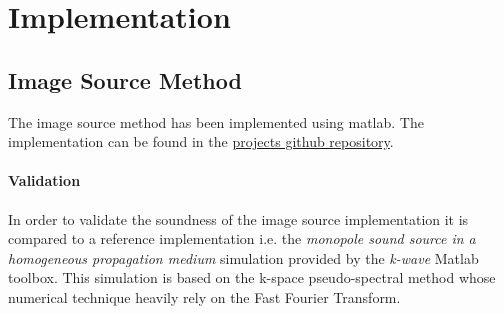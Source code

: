 \chapter{Implementation}
\label{chap:implementation}
\section{Image Source Method}
The image source method has been implemented using matlab. The implementation can be found in the \color{blue}\href{https://github.com/leonardberresheim/MA---Active-Noise-Control-in-Spatial-Domains/tree/main/Matlab/Image_Source_Method/ISM}{projects github repository}.\color{black}


\subsubsection{Validation}
In order to validate the soundness of the image source implementation it is compared to a reference implementation i.e. the \textit{monopole sound source in a homogeneous propagation medium} simulation provided by the \textit{k-wave} Matlab toolbox. This simulation is based on the k-space pseudo-spectral method whose numerical technique heavily rely on the Fast Fourier Transform.\cite{kwave}

